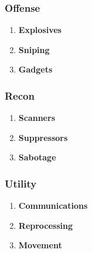 \subsubsection{Offense}
\begin{enumerate}[label= -]
    \item \textbf{Explosives}
    \item \textbf{Sniping}
    \item \textbf{Gadgets}
\end{enumerate}
\subsubsection{Recon}
\begin{enumerate}[label= -]
    \item \textbf{Scanners}
    \item \textbf{Suppressors}
    \item \textbf{Sabotage}
\end{enumerate}
\subsubsection{Utility}
\begin{enumerate}[label= -]
    \item \textbf{Communications}
    \item \textbf{Reprocessing}
    \item \textbf{Movement}
\end{enumerate}